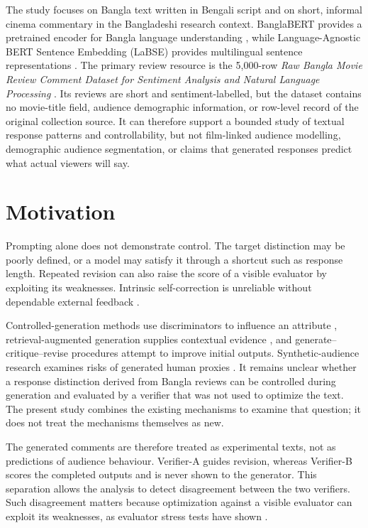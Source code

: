 The study focuses on Bangla text written in Bengali script and on short, informal cinema commentary in the Bangladeshi research context. BanglaBERT provides a pretrained encoder for Bangla language understanding \cite{b2}, while Language-Agnostic BERT Sentence Embedding (LaBSE) provides multilingual sentence representations \cite{b3}. The primary review resource is the 5,000-row \emph{Raw Bangla Movie Review Comment Dataset for Sentiment Analysis and Natural Language Processing} \cite{b4}. Its reviews are short and sentiment-labelled, but the dataset contains no movie-title field, audience demographic information, or row-level record of the original collection source. It can therefore support a bounded study of textual response patterns and controllability, but not film-linked audience modelling, demographic audience segmentation, or claims that generated responses predict what actual viewers will say.

\section{Motivation}

Prompting alone does not demonstrate control. The target distinction may be poorly defined, or a model may satisfy it through a shortcut such as response length. Repeated revision can also raise the score of a visible evaluator by exploiting its weaknesses. Intrinsic self-correction is unreliable without dependable external feedback \cite{b5,b6}.

Controlled-generation methods use discriminators to influence an attribute \cite{b11}, retrieval-augmented generation supplies contextual evidence \cite{b8}, and generate–critique–revise procedures attempt to improve initial outputs. Synthetic-audience research examines risks of generated human proxies \cite{b1}. It remains unclear whether a response distinction derived from Bangla reviews can be controlled during generation and evaluated by a verifier that was not used to optimize the text. The present study combines the existing mechanisms to examine that question; it does not treat the mechanisms themselves as new.

The generated comments are therefore treated as experimental texts, not as predictions of audience behaviour. Verifier-A guides revision, whereas Verifier-B scores the completed outputs and is never shown to the generator. This separation allows the analysis to detect disagreement between the two verifiers. Such disagreement matters because optimization against a visible evaluator can exploit its weaknesses, as evaluator stress tests have shown \cite{b7}.

